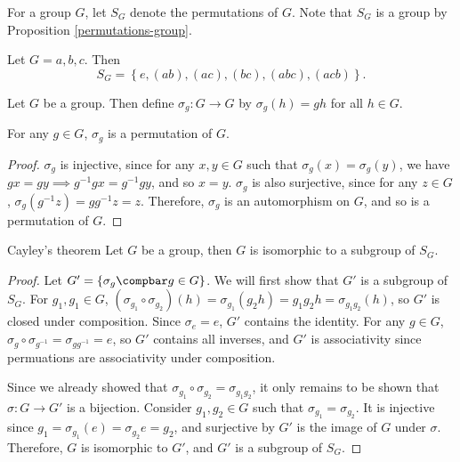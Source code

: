 \documentclass[12pt]{article}
\begin{document}
\begin{defn}
    For a group $G$, let $S_G$ denote the permutations of $G$. Note that $S_G$ is a group by Proposition \ref{permutations-group}.
\end{defn}

\begin{exmp}
    Let $G = {a, b, c}$. Then \[S_G = \left\{e, (ab), (ac), (bc), (abc), (acb)\right\}.\]
\end{exmp}

\begin{defn}
    Let $G$ be a group. Then define $\sigma_g: G \to G$ by $\sigma_g(h) = gh$ for all $h \in G$.
\end{defn}

\begin{lemma}
    For any $g \in G$, $\sigma_g$ is a permutation of $G$.
\end{lemma}

\begin{proof}
    $\sigma_g$ is injective, since for any $x, y \in G$ such that $\sigma_g(x) = \sigma_g(y)$, we have $gx = gy \implies g^{-1}gx = g^{-1}gy$, and so $x = y$. $\sigma_g$ is also surjective, since for any $z \in G$, $\sigma_g(g^{-1}z) = gg^{-1}z = z$. Therefore, $\sigma_g$ is an automorphism on $G$, and so is a permutation of $G$.
\end{proof}

\begin{thm}Cayley's theorem\label{cayleys}\proofbreak
    Let $G$ be a group, then $G$ is isomorphic to a subgroup of $S_G$.
\end{thm}

\begin{proof}
    Let $G' = \left\{\sigma_g \compbar g \in G\right\}$. We will first show that $G'$ is a subgroup of $S_G$. For $g_1, g_1 \in G$, $(\sigma_{g_1} \circ \sigma_{g_2})(h) = \sigma_{g_1}(g_2h) = g_1g_2h = \sigma_{g_1g_2}(h)$, so $G'$ is closed under composition. Since $\sigma_e = e$, $G'$ contains the identity. For any $g \in G$, $\sigma_g \circ \sigma_{g^{-1}} = \sigma_{gg^{-1}} = e$, so $G'$ contains all inverses, and $G'$ is associativity since permuations are associativity under composition.

    Since we already showed that $\sigma_{g_1} \circ \sigma_{g_2} = \sigma_{g_1g_2}$, it only remains to be shown that $\sigma: G \to G'$ is a bijection. Consider $g_1, g_2 \in G$ such that $\sigma_{g_1} = \sigma_{g_2}$. It is injective since $g_1 = \sigma_{g_1}(e) = \sigma_{g_2}e = g_2$, and surjective by $G'$ is the image of $G$ under $\sigma$. Therefore, $G$ is isomorphic to $G'$, and $G'$ is a subgroup of $S_G$.
\end{proof}
\end{document}
